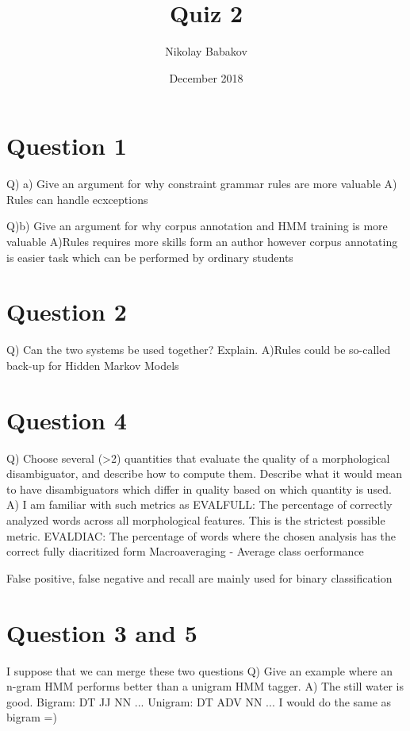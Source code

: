 \documentclass{article}
\title{Quiz 2}
\author{Nikolay Babakov}
\date{December 2018}
\begin{document}
\maketitle

\section{Question 1}
Q) a) Give an argument for why constraint grammar rules are more valuable
A) Rules can handle ecxceptions

Q)b) Give an argument for why corpus annotation and HMM training is more valuable
A)Rules requires more skills form an author however corpus annotating is easier task which can be performed by ordinary students

\section{Question 2}
Q) Can the two systems be used together? Explain.
A)Rules could be so-called back-up for Hidden Markov Models

\section{Question 4}
Q) Choose several (>2) quantities that evaluate the quality of a morphological disambiguator, and describe how to compute them. Describe what it would mean to have disambiguators which differ in quality based on which quantity is used.
A) 
I am familiar with such metrics as
EVALFULL: The percentage of correctly analyzed words across all morphological features. This is the strictest possible metric.
EVALDIAC: The percentage of words where the chosen analysis has the correct fully diacritized form
Macroaveraging - Average class oerformance

False positive, false negative and recall are mainly used for binary classification

\section{Question 3 and 5}
I suppose that we can merge these two questions
Q) Give an example where an n-gram HMM performs better than a unigram HMM tagger.
A) The still water is good.
Bigram: DT JJ NN ...
Unigram: DT ADV NN ...
I would do the same as bigram =)
\end{document}
